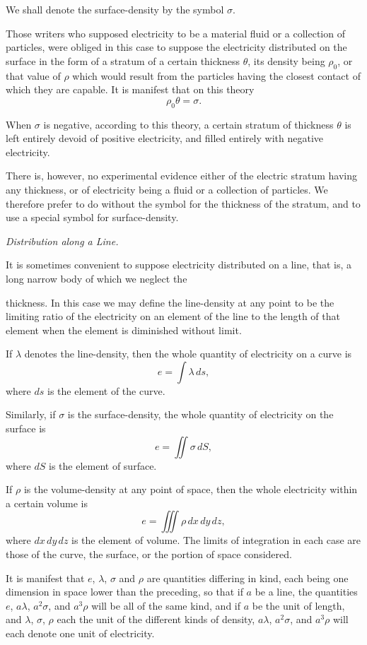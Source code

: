 \documentclass[11pt,a4paper]{article}
\begin{document}
We shall denote the surface-density by the symbol \(\sigma\).

Those writers who supposed electricity to be a material fluid or a
collection of particles, were obliged in this case to suppose the
electricity distributed on the surface in the form of a stratum of a
certain thickness \(\theta\), its density being \(\rho_0\), or that value of
\(\rho\) which would result from the particles having the closest contact
of which they are capable. It is manifest that on this theory
\[
\rho_0\theta=\sigma.
\]

When \(\sigma\) is negative, according to this theory, a certain stratum
of thickness \(\theta\) is left entirely devoid of positive electricity, and
filled entirely with negative electricity.

There is, however, no experimental evidence either of the electric
stratum having any thickness, or of electricity being a fluid or a
collection of particles. We therefore prefer to do without the symbol
for the thickness of the stratum, and to use a special symbol for
surface-density.

\begin{center}
\textit{Distribution along a Line.}
\end{center}

It is sometimes convenient to suppose electricity distributed on a line,
that is, a long narrow body of which we neglect the

\clearpage
\setcounter{footnote}{0}

thickness. In this case we may define the line-density at any point
to be the limiting ratio of the electricity on an element of the line
to the length of that element when the element is diminished without
limit.

If \(\lambda\) denotes the line-density, then the whole quantity of
electricity on a curve is
\[
e=\int \lambda\,ds,
\]
where \(ds\) is the element of the curve.

Similarly, if \(\sigma\) is the surface-density, the whole quantity of
electricity on the surface is
\[
e=\iint \sigma\,dS,
\]
where \(dS\) is the element of surface.

If \(\rho\) is the volume-density at any point of space, then the whole
electricity within a certain volume is
\[
e=\iiint \rho\,dx\,dy\,dz,
\]
where \(dx\,dy\,dz\) is the element of volume. The limits of integration
in each case are those of the curve, the surface, or the portion of
space considered.

It is manifest that \(e\), \(\lambda\), \(\sigma\) and \(\rho\) are quantities
differing in kind, each being one dimension in space lower than the
preceding, so that if \(a\) be a line, the quantities \(e\), \(a\lambda\),
\(a^2\sigma\), and \(a^3\rho\) will be all of the same kind, and if
\(a\) be the unit of length, and \(\lambda\), \(\sigma\), \(\rho\) each the
unit of the different kinds of density, \(a\lambda\), \(a^2\sigma\), and
\(a^3\rho\) will each denote one unit of electricity.
\end{document}
